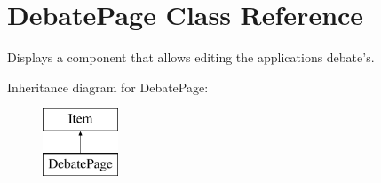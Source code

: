 \hypertarget{classDebatePage}{\section{Debate\-Page Class Reference}
\label{classDebatePage}
}


Displays a component that allows editing the applications debate's.  


Inheritance diagram for Debate\-Page\-:\begin{figure}[H]
\begin{center}
\leavevmode
\includegraphics[height=2.000000cm]{classDebatePage}
\end{center}
\end{figure}
